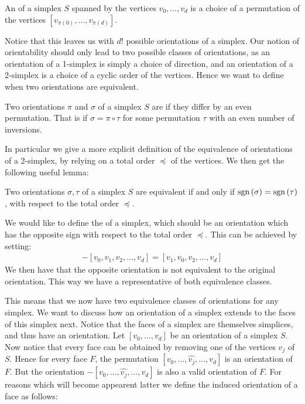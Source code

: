 \begin{definition}
    An  of a simplex $S$ spanned by the vertices $v_0, \dots, v_d$ is a choice of a permutation of the vertices $[v_{\pi(0)}, \dots, v_{\pi(d)}]$.
\end{definition}

Notice that this leaves us with $d!$ possible orientations of a simplex. Our notion of orientability should only lead to two possible classes of orientations, as an orientation of a 1-simplex is simply a choice of direction, and an orientation of a 2-simplex is a choice of a cyclic order of the vertices. Hence we want to define when two orientations are equivalent.

\begin{definition}
    Two orientations $\pi$ and $\sigma$ of a simplex $S$ are  if they differ by an even permutation. That is if $\sigma = \pi \circ \tau$ for some permutation $\tau$ with an even number of inversions.
\end{definition}

In particular we give a more explicit definition of the equivalence of orientations of a 2-simplex, by relying on a total order $\preceq$ of the vertices. We then get the following useful lemma:

\begin{lemma}
    Two orientations $\sigma, \tau$ of a simplex $S$ are equivalent if and only if $\operatorname{sgn}\left(\sigma\right) = \operatorname{sgn}\left(\tau\right)$, with respect to the total order $\preceq$.
\end{lemma}

We would like to define the  of a simplex, which should be an orientation which has the opposite sign with respect to the total order $\preceq$. This can be achieved by setting:
\begin{align*}
    - [v_0, v_1, v_2, \dots, v_d] = [v_1, v_0, v_2, \dots, v_d]
\end{align*}
We then have that the opposite orientation is not equivalent to the original orientation. This way we have a representative of both equivalence classes.

This means that we now have two equivalence classes of orientations for any simplex. We want to discuss how an orientation of a simplex extends to the faces of this simplex next. Notice that the faces of a simplex are themselves simplices, and thus have an orientation. Let $[v_0, \dots, v_{d}]$ be an orientation of a simplex $S$. Now notice that every face can be obtained by removing one of the vertices $v_j$ of $S$. Hence for every face $F$, the permutation $[v_0, \dots, \hat{v_j}, \dots, v_{d}]$ is an orientation of $F$. But the orientation $- [v_0, \dots, \hat{v_j}, \dots, v_{d}]$ is also a valid orientation of $F$. For reasons which will become appearent latter we define the induced orientation of a face as follows:

